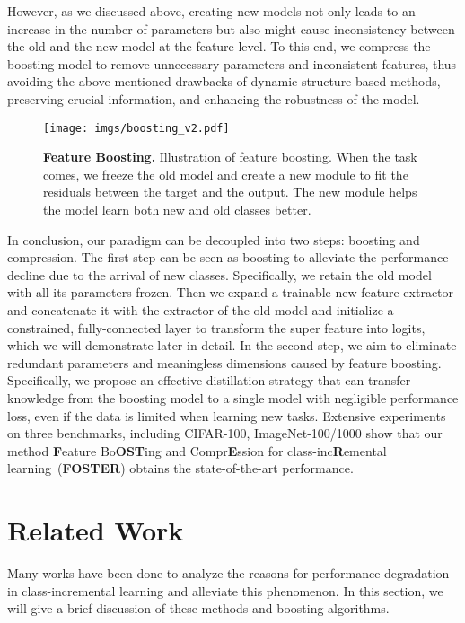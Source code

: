 \documentclass[runningheads]{llncs}
\begin{document}
However, as we discussed above, creating new models not only leads to an increase in the number of parameters but also might cause inconsistency between the old and the new model at the feature level. To this end, we compress the boosting model to remove unnecessary parameters and inconsistent features, thus avoiding the above-mentioned drawbacks of dynamic structure-based methods, preserving crucial information, and enhancing the robustness of the model.  

\begin{figure}[t]
    \centering
    \texttt{[image: imgs/boosting\_v2.pdf]}
    \caption{\small \textbf{Feature Boosting.} Illustration of feature boosting. When the task comes, we freeze the old model and create a new module to fit the residuals between the target and the output. The new module helps the model learn both new and old classes better. }
    \label{fig:boosting}
\end{figure}

In conclusion, our paradigm can be decoupled into two steps: boosting and compression. The first step can be seen as boosting to alleviate the performance decline due to the arrival of new classes. Specifically, we retain the old model with all its parameters frozen. Then we expand a trainable new feature extractor and concatenate it with the extractor of the old model and initialize a constrained, fully-connected layer to transform the super feature into logits, which we will demonstrate later in detail.  In the second step, we aim to eliminate redundant parameters and meaningless dimensions caused by feature boosting. Specifically, we propose an effective distillation strategy that can transfer knowledge from the boosting model to a single model with negligible performance loss, even if the data is limited when learning new tasks. Extensive experiments on three benchmarks, including CIFAR-100, ImageNet-100/1000 show that our method \textbf{F}eature Bo\textbf{O}\textbf{ST}ing and  Compr\textbf{E}ssion for class-inc\textbf{R}emental learning~(\textbf{FOSTER}) obtains the state-of-the-art performance. 


\section{Related Work}

Many works have been done to analyze the reasons for performance degradation in class-incremental learning and alleviate this phenomenon. In this section, we will give a brief discussion of these methods and boosting algorithms.
\end{document}
